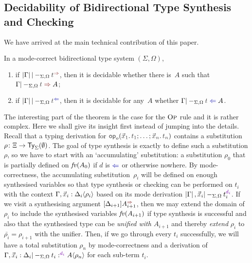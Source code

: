 
\subsection{Decidability of Bidirectional Type Synthesis and Checking}\label{subsec:bidirectional-synthesis-checking}

We have arrived at the main technical contribution of this paper.

\begin{theorem} \label{thm:bidirectional-type-synthesis-checking}
  In a mode-correct bidirectional type system $(\Sigma, \Omega)$,
  \begin{enumerate}
    \item if\/ $\erase{\Gamma} |-_{\Sigma, \Omega} \isTerm{t}^{\syn}$, then it is decidable whether there is~$A$ such that $\Gamma |-_{\Sigma, \Omega} \isTerm{t} \syn A$;
    \item if\/ $\erase{\Gamma} |-_{\Sigma, \Omega} \isTerm{t}^{\chk}$, then it is decidable for any~$A$ whether $\Gamma |-_{\Sigma, \Omega} \isTerm{t} \chk A$.
  \end{enumerate}
\end{theorem}

The interesting part of the theorem is the case for the $\textnormal{\textsc{Op}}$ rule and it is rather complex.
Here we shall give its insight first instead of jumping into the details.
Recall that a typing derivation for $\tmOpts$ contains a substitution $\rho\colon \Xi \to \mathsf{Ty}_{\Sigma}(\emptyset)$.
The goal of type synthesis is exactly to define such a substitution $\rho$, so we have to start with an `accumulating' substitution: a substitution $\rho_0$ that is partially defined on $\mathit{fv}(A_0)$ if $d$ is $\chk$ or otherwise nowhere.
By mode-correctness, the accumulating substitution~$\rho_i$ will be defined on enough synthesised variables so that type synthesis or checking can be performed on $t_{i}$ with the context $\Gamma, \vars{x}_{i} : \simsub{\Delta_{i}}{\rho_{i}}$ based on its mode derivation $\erase{\Gamma}, \vars{x}_i |-_{\Sigma, \Omega} t_i^{\dir{d_i}}$.
If we visit a synthesising argument $\synbiarg[i+1]$, then we may extend the domain of $\rho_i$ to include the synthesised variables $\mathit{fv}(A_{i + 1})$ if type synthesis is successful and also that the synthesised type can be \emph{unified with $A_{i+ 1}$} and thereby \emph{extend} $\rho_i$ to $\bar{\rho_i} = \rho_{i+1}$ with the unifier.
Then, if we go through every $t_i$ successfully, we will have a total substitution $\rho_n$ by mode-correctness and a derivation of $\Gamma, \vars{x}_i : \Delta_i |-_{\Sigma, \Omega} t_i :^{\dir{d_i}} \simsub{A}{\rho_n}$ for each sub-term $t_i$.

